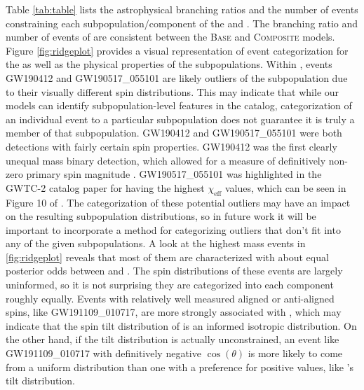 Table \ref{tab:table} lists the astrophysical branching ratios and the number of events constraining each subpopulation/component of the \base{} and \comp{}. The branching ratio and number of events of \first{} are consistent between the \textsc{Base} and \textsc{Composite} models. Figure \ref{fig:ridgeplot} provides a visual representation of event categorization for the \comp{} as well as the physical properties of the subpopulations. Within \contA{}, events GW190412 and GW190517\_055101 are likely outliers of the subpopulation due to their visually different spin distributions. This may indicate that while our models can identify subpopulation-level features in the catalog, categorization of an individual event to a particular subpopulation does not guarantee it is truly a member of that subpopulation. GW190412 and GW190517\_055101 were both detections with fairly certain spin properties. GW190412 was the first clearly unequal mass binary detection, which allowed for a measure of definitively non-zero primary spin magnitude \citep{10.3847/2041-8213/aba8ef, 2010.14527}. GW190517\_055101 was highlighted in the GWTC-2 catalog paper \citet{2010.14527} for having the highest $\chi_\text{eff}$ values, which can be seen in Figure 10 of \citet{2010.14527}. The categorization of these potential outliers may have an impact on the resulting subpopulation distributions, so in future work it will be important to incorporate a method for categorizing outliers that don't fit into any of the given subpopulations.
A look at the highest mass events in \ref{fig:ridgeplot} reveals that most of them are characterized with about equal posterior odds between \contA{} and \contB{}. The spin distributions of these events are largely uninformed, so it is not surprising they are categorized into each component roughly equally. Events with relatively well measured aligned or anti-aligned spins, like GW191109\_010717, are more strongly associated with \contB{}, which may indicate that the spin tilt distribution of \contB{} is an informed isotropic distribution. On the other hand, if the tilt distribution is actually unconstrained, an event like GW191109\_010717 with definitively negative $\cos(\theta)$ is more likely to come from a uniform distribution than one with a preference for positive values, like \contA{}'s tilt distribution.


